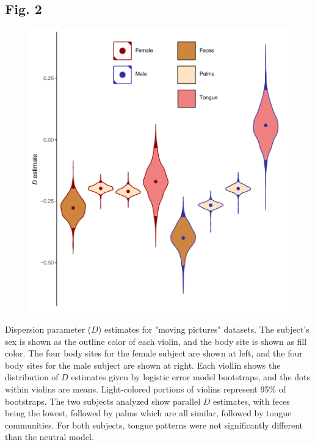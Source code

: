 \documentclass{article}
\begin{document}
{\subsection{Fig. 2}\label{sec:figure2}
\begin{figure}[ht]
	\centering
	\includegraphics[scale=0.80]{figs/Fig_2.pdf}
\end{figure}
Dispersion parameter (\(D\)) estimates for "moving pictures" \cite{Caporaso2011} datasets. The subject’s sex is shown as the outline color of each violin, and the body site is shown as fill color. The four body sites for the female subject are shown at left, and the four body sites for the male subject are shown at right. Each viollin shows the distribution of \(D\) estimates given by logistic error model bootstraps, and the dots within violins are means. Light-colored portions of violins represent 95\% of bootstraps. The two subjects analyzed show parallel \(D\) estimates, with feces being the lowest, followed by palms which are all similar, followed by tongue communities. For both subjects, tongue patterns were not significantly different than the neutral model.
\newpage

}
\end{document}
